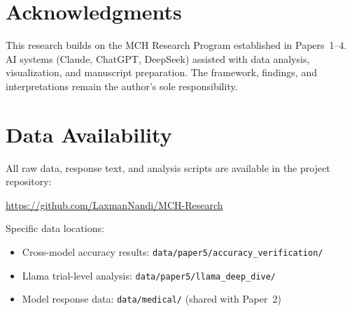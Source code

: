 \documentclass[11pt,a4paper]{article}
\begin{document}
\section*{Acknowledgments}

This research builds on the MCH Research Program established in Papers~1--4. AI systems (Claude, ChatGPT, DeepSeek) assisted with data analysis, visualization, and manuscript preparation. The framework, findings, and interpretations remain the author's sole responsibility.

\section*{Data Availability}

All raw data, response text, and analysis scripts are available in the project repository:

\noindent\url{https://github.com/LaxmanNandi/MCH-Research}

\noindent Specific data locations:
\begin{itemize}
    \item Cross-model accuracy results: \texttt{data/paper5/accuracy\_verification/}
    \item Llama trial-level analysis: \texttt{data/paper5/llama\_deep\_dive/}
    \item Model response data: \texttt{data/medical/} (shared with Paper~2)
\end{itemize}
\end{document}
